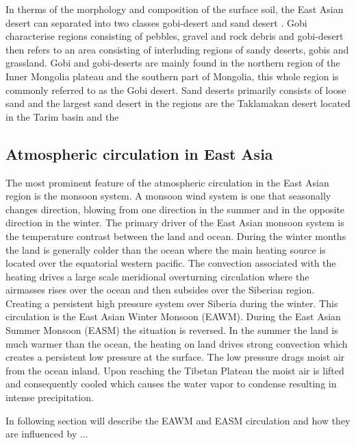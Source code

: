 
In therms of the morphology and composition of the surface soil, the East Asian desert can separated into two classes gobi-desert and sand desert \parencite{xuan2002characterization}. Gobi characterise regions consisting of pebbles, gravel and rock debris and gobi-desert then refers to an area consisting of interluding regions of sandy deserts, gobis and grassland. Gobi and gobi-deserts are mainly found in the northern region of the Inner Mongolia plateau and the southern part of Mongolia, this whole region is commonly referred to as the Gobi desert. Sand deserts primarily consists of loose sand and the largest sand desert in the regions are the Taklamakan desert located in the Tarim basin and the   

\subsection{Atmospheric circulation in East Asia}
The most prominent feature of the atmospheric circulation in the East Asian region is the monsoon system. A monsoon wind system is one that seasonally changes direction, blowing from one direction in the summer and in the opposite direction in the winter. The primary driver of the East Asian monsoon system is the temperature contrast between the land and ocean. During the winter months the land is generally colder than the ocean where the main heating source is located over the equatorial western pacific. The convection associated with the heating drives a large scale meridional overturning circulation where the airmasses rises over the ocean and then subsides over the Siberian region. Creating a persistent high pressure system over Siberia during the winter. This circulation is the East Asian Winter Monsoon (EAWM). During the East Asian Summer Monsoon (EASM) the situation is reversed. In the summer the land is much warmer than the ocean, the heating on land drives strong convection which creates a persistent low pressure at the surface. The low pressure drags moist air from the ocean inland. Upon reaching the Tibetan Plateau the moist air is lifted and consequently cooled which causes the water vapor to condense resulting in intense precipitation. 

In following section will describe the EAWM and EASM circulation and how they are influenced by ...   

